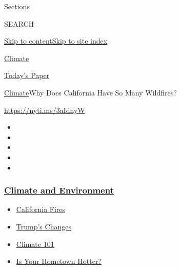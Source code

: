 Sections

SEARCH

\protect\hyperlink{site-content}{Skip to
content}\protect\hyperlink{site-index}{Skip to site index}

\href{https://www.nytimes3xbfgragh.onion/section/climate}{Climate}

\href{https://myaccount.nytimes3xbfgragh.onion/auth/login?response_type=cookie\&client_id=vi}{}

\href{https://www.nytimes3xbfgragh.onion/section/todayspaper}{Today's
Paper}

\href{/section/climate}{Climate}\textbar{}Why Does California Have So
Many Wildfires?

\url{https://nyti.ms/3aIdnyW}

\begin{itemize}
\item
\item
\item
\item
\item
\end{itemize}

\hypertarget{climate-and-environment}{%
\subsubsection{\texorpdfstring{\href{https://www.nytimes3xbfgragh.onion/section/climate?name=styln-climate\&region=TOP_BANNER\&block=storyline_menu_recirc\&action=click\&pgtype=Article\&impression_id=054f5af0-f29f-11ea-9e00-ad25b2d773f7\&variant=undefined}{Climate
and
Environment}}{Climate and Environment}}\label{climate-and-environment}}

\begin{itemize}
\tightlist
\item
  \href{https://www.nytimes3xbfgragh.onion/article/why-does-california-have-wildfires.html?name=styln-climate\&region=TOP_BANNER\&block=storyline_menu_recirc\&action=click\&pgtype=Article\&impression_id=054f5af1-f29f-11ea-9e00-ad25b2d773f7\&variant=undefined}{California
  Fires}
\item
  \href{https://www.nytimes3xbfgragh.onion/interactive/2020/climate/trump-environment-rollbacks.html?name=styln-climate\&region=TOP_BANNER\&block=storyline_menu_recirc\&action=click\&pgtype=Article\&impression_id=054f5af2-f29f-11ea-9e00-ad25b2d773f7\&variant=undefined}{Trump's
  Changes}
\item
  \href{https://www.nytimes3xbfgragh.onion/interactive/2020/04/19/climate/climate-crash-course-1.html?name=styln-climate\&region=TOP_BANNER\&block=storyline_menu_recirc\&action=click\&pgtype=Article\&impression_id=054f5af3-f29f-11ea-9e00-ad25b2d773f7\&variant=undefined}{Climate
  101}
\item
  \href{https://www.nytimes3xbfgragh.onion/interactive/2018/08/30/climate/how-much-hotter-is-your-hometown.html?name=styln-climate\&region=TOP_BANNER\&block=storyline_menu_recirc\&action=click\&pgtype=Article\&impression_id=054f8200-f29f-11ea-9e00-ad25b2d773f7\&variant=undefined}{Is
  Your Hometown Hotter?}
\end{itemize}

